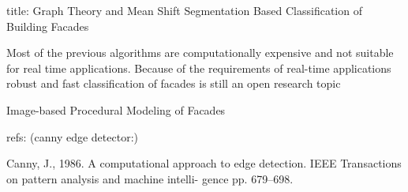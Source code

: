title: Graph Theory and Mean Shift Segmentation Based Classiﬁcation of Building Facades

Most of the previous algorithms are computationally expensive and not suitable for real time applications. Because
of the requirements of real-time applications robust and fast
classiﬁcation of facades is still an open research topic


Image-based Procedural Modeling of Facades



refs:
(canny edge detector:)

Canny, J., 1986. A computational approach to edge detection.
IEEE Transactions on pattern analysis and machine intelli-
gence pp. 679–698.

